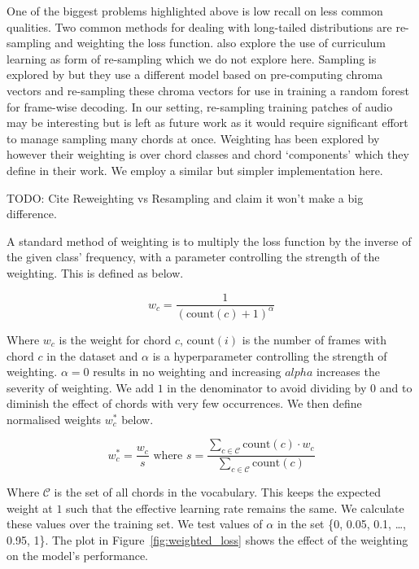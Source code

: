 One of the biggest problems highlighted above is low recall on less common qualities. Two common methods for dealing with long-tailed distributions are re-sampling and weighting the loss function. \citet{CurriculumLearning} also explore the use of curriculum learning as form of re-sampling which we do not explore here. Sampling is explored by \citet{BalanceRandomForestACR} but they use a different model based on pre-computing chroma vectors and re-sampling these chroma vectors for use in training a random forest for frame-wise decoding. In our setting, re-sampling training patches of audio may be interesting but is left as future work as it would require significant effort to manage sampling many chords at once. Weighting has been explored by \citet{ACRLargeVocab1} however their weighting is over chord classes and chord `components' which they define in their work. We employ a similar but simpler implementation here.

TODO: Cite Reweighting vs Resampling and claim it won't make a big difference.

A standard method of weighting is to multiply the loss function by the inverse of the given class' frequency, with a parameter controlling the strength of the weighting. This is defined as below.

\begin{equation}
    w_c = \frac{1}{{(\text{count}(c) + 1)}^\alpha}
\end{equation}

Where $w_c$ is the weight for chord $c$, $\text{count}(i)$ is the number of frames with chord $c$ in the dataset and $\alpha$ is a hyperparameter controlling the strength of weighting. $\alpha=0$ results in no weighting and increasing $alpha$ increases the severity of weighting. We add $1$ in the denominator to avoid dividing by $0$ and to diminish the effect of chords with very few occurrences. We then define normalised weights $w_c^*$ below.

\begin{equation}\label{eq:weighted_loss}
    w_c^* = \frac{w_c}{s} \text{ where } s = \frac{\sum_{c\in \mathcal{C}} \text{count}(c)\cdot w_c}{\sum_{c\in \mathcal{C}} \text{count}(c)}
\end{equation}

Where $\mathcal{C}$ is the set of all chords in the vocabulary. This keeps the expected weight at $1$ such that the effective learning rate remains the same. We calculate these values over the training set. We test values of $\alpha$ in the set \{0, 0.05, 0.1, \ldots, 0.95, 1\}. The plot in Figure~\ref{fig:weighted_loss} shows the effect of the weighting on the model's performance.

